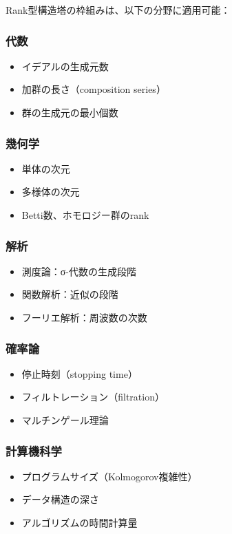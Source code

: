 \documentclass[a4paper,12pt]{ltjsarticle}
\theoremstyle{definition}
\begin{document}
Rank型構造塔の枠組みは、以下の分野に適用可能：

\subsubsection{代数}
\begin{itemize}
\item イデアルの生成元数
\item 加群の長さ（composition series）
\item 群の生成元の最小個数
\end{itemize}

\subsubsection{幾何学}
\begin{itemize}
\item 単体の次元
\item 多様体の次元
\item Betti数、ホモロジー群のrank
\end{itemize}

\subsubsection{解析}
\begin{itemize}
\item 測度論：σ-代数の生成段階
\item 関数解析：近似の段階
\item フーリエ解析：周波数の次数
\end{itemize}

\subsubsection{確率論}
\begin{itemize}
\item 停止時刻（stopping time）
\item フィルトレーション（filtration）
\item マルチンゲール理論
\end{itemize}

\subsubsection{計算機科学}
\begin{itemize}
\item プログラムサイズ（Kolmogorov複雑性）
\item データ構造の深さ
\item アルゴリズムの時間計算量
\end{itemize}
\end{document}

